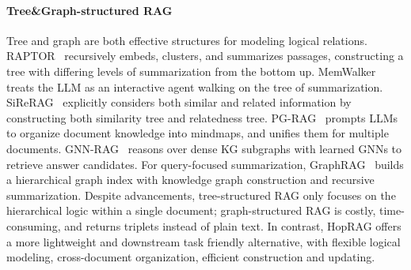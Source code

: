 \paragraph{Tree\&Graph-structured RAG}
Tree and graph are both effective structures for modeling logical relations.
RAPTOR~\citep{RAPTOR} recursively embeds, clusters, and summarizes passages, constructing a tree with differing levels of summarization from the bottom up.
MemWalker~\citep{chen_walking_2023} treats the LLM as an interactive agent walking on the tree of summarization. SiReRAG~\citep{zhang2024sireragindexingsimilarrelated} explicitly considers both similar and related information by constructing both similarity tree and relatedness tree. 
PG-RAG~\citep{PG-RAG} prompts LLMs to organize document knowledge into mindmaps, and unifies them for multiple documents. 
GNN-RAG~\citep{GNN-RAG} reasons over dense KG subgraphs with learned GNNs to retrieve answer candidates.
For query-focused summarization, GraphRAG~\citep{GraphRAG} builds a hierarchical graph index with knowledge graph construction and recursive summarization. 
Despite advancements, tree-structured RAG only focuses on the hierarchical logic within a single document; graph-structured RAG is costly, time-consuming, and returns triplets instead of plain text. 
In contrast, HopRAG offers a more lightweight and downstream task friendly alternative, with flexible logical modeling, cross-document organization, efficient construction and updating.






